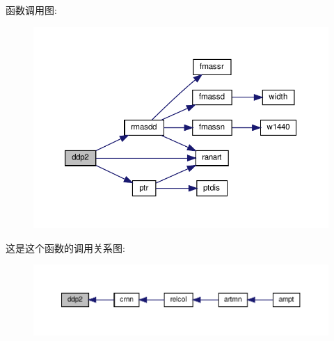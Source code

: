 函数调用图\+:
\nopagebreak
\begin{figure}[H]
\begin{center}
\leavevmode
\includegraphics[width=350pt]{ddp2_8f90_abb134740aef9d1048862edfa2719e930_cgraph}
\end{center}
\end{figure}
这是这个函数的调用关系图\+:
\nopagebreak
\begin{figure}[H]
\begin{center}
\leavevmode
\includegraphics[width=350pt]{ddp2_8f90_abb134740aef9d1048862edfa2719e930_icgraph}
\end{center}
\end{figure}
